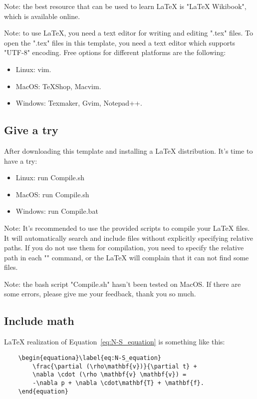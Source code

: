 Note: the best resource that can be used to learn \LaTeX{} is "\LaTeX{} Wikibook", which is available online.

Note: to use \LaTeX{}, you need a text editor for writing and editing ".tex" files. To open the ".tex" files in this template, you need a text editor which supports "UTF-8" encoding. Free options for different platforms are the following:
\begin{itemize}
    \item Linux: vim. 
    \item MacOS: TeXShop, Macvim.
    \item Windows: Texmaker, Gvim, Notepad++. 
\end{itemize}

\subsection{Give a try} %
After downloading this template and installing a \LaTeX{} distribution. It's time to have a try:
\begin{itemize}
    \item Linux: run Compile.sh
    \item MacOS: run Compile.sh
    \item Windows: run Compile.bat
\end{itemize}

Note: It's recommended to use the provided scripts to compile your \LaTeX{} files. It will automatically search and include files without explicitly specifying relative paths. If you do not use them for compilation, you need to specify the relative path in each "\verb++" command, or the \LaTeX{} will complain that it can not find some files.

Note: the bash script "Compile.sh" hasn't been tested on MacOS. If there are some errors, please give me your feedback, thank you so much.


\subsection{Include math} %
\LaTeX{} realization of Equation~\ref{eq:N-S_equation} is something like this:
\begin{center}
    \small
    \begin{verbatim}
    \begin{equationa}\label{eq:N-S_equation}
        \frac{\partial (\rho\mathbf{v})}{\partial t} +
        \nabla \cdot (\rho \mathbf{v} \mathbf{v}) =
        -\nabla p + \nabla \cdot\mathbf{T} + \mathbf{f}. 
    \end{equation}    
\end{verbatim}
\end{center}

